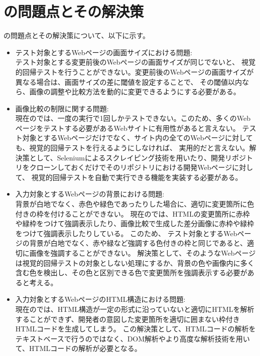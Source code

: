 \section{\toolName の問題点とその解決策}\label{sec:AWSAL_problems}
\toolName の問題点とその解決策について、以下に示す。
\begin{itemize}
    \item テスト対象とするWebページの画面サイズにおける問題:\\
          テスト対象とする変更前後のWebページの画面サイズが同じでないと、
          視覚的回帰テストを行うことができない。変更前後のWebページの画面サイズが異なる場合は、画面サイズの差に閾値を設定することで、
          その閾値以内なら、画像の調整や比較方法を動的に変更できるようにする必要がある。
    \item 画像比較の制限に関する問題:\\
          現在の\toolName では、一度の実行で1回しかテストできない。このため、多くのWebページをテストする必要があるWebサイトに有用性があると言えない。
          テスト対象とするWebページだけでなく、サイト内の全てのWebページに対しても、視覚的回帰テストを行えるようにしなければ、
          実用的だと言えない。解決策として、Seleniumによるスクレイピング技術を用いたり、開発リポジトリをクローンしておくだけでそのリポジトリにおける開発Webページに対して、
          視覚的回帰テストを自動で実行できる機能を実装する必要がある。
    \item 入力対象とするWebページの背景における問題:\\
          背景が白地でなく、赤色や緑色であったりした場合に、適切に変更箇所に色付きの枠を付けることができない。
          現在の\toolName では、HTMLの変更箇所に赤枠や緑枠をつけて強調表示したり、画像比較で生成した差分画像に赤枠や緑枠をつけて強調表示したりしている。
          このため、
          テスト対象とするWebページの背景が白地でなく、赤や緑など強調する色付きの枠と同じであると、適切に画像を強調することができない。
          解決策として、そのようなWebページは視覚的回帰テストの対象としない処理にするか、背景の色や画像内に多く含む色を検出し、その色と区別できる色で変更箇所を強調表示する必要があると考える。
    \item 入力対象とするWebページのHTML構造における問題:\\
          現在の\toolName では、HTML構造が一定の形式に沿っていないと適切にHTMLを解析することができず、開発者の意図した変更箇所を適切に囲まない枠付きHTMLコードを生成してしまう。
          この解決策として、HTMLコードの解析をテキストベースで行うのではなく、DOM解析やより高度な解析技術を用いて、HTMLコードの解析が必要となる。

\end{itemize}
